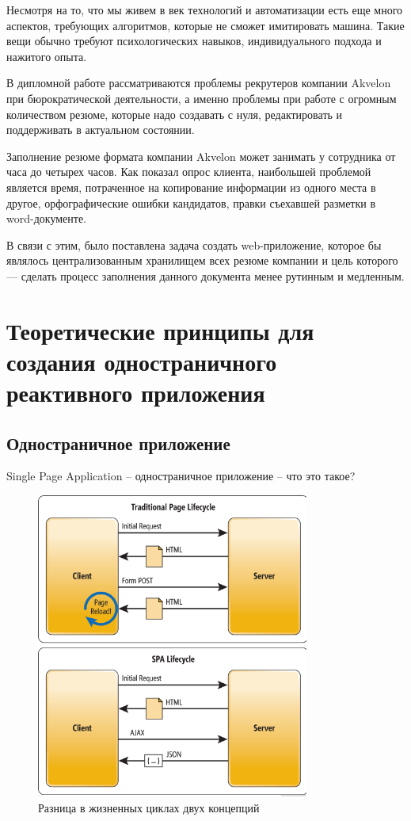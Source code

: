 \documentclass[a4paper,12pt]{diplom}
\begin{document}
\medskip

\tableofcontents[Содержание]


Несмотря на то, что мы живем в век технологий и автоматизации есть еще много аспектов,
требующих алгоритмов, которые не сможет имитировать машина. Такие вещи обычно требуют
психологических навыков, индивидуального подхода и нажитого опыта.

В дипломной работе рассматриваются проблемы рекрутеров компании
Akvelon при бюрократической деятельности,
а именно проблемы при работе с огромным количеством резюме, которые надо создавать с нуля, редактировать и
поддерживать в актуальном состоянии.

Заполнение резюме формата компании Akvelon
может занимать у сотрудника от часа до четырех часов. Как показал опрос клиента, наибольшей проблемой является время, потраченное
на копирование информации из одного места в другое, орфографические ошибки кандидатов, правки
съехавшей разметки в word-документе.

В связи с этим, было поставлена задача создать web-приложение, которое бы являлось централизованным хранилищем
всех резюме компании и цель которого — сделать процесс заполнения данного документа менее рутинным и медленным.

\chapter{Теоретические принципы для создания одностраничного реактивного приложения}

\section{Одностраничное приложение}
Single Page Application – одностраничное приложение – что это такое?

\begin{figure}[!ht]
\centering
\includegraphics[width=0.8\textwidth]{resources/lifecycle.png}
\caption{Разница в жизненных циклах двух концепций}
\label{a}
\end{figure}
\end{document}
